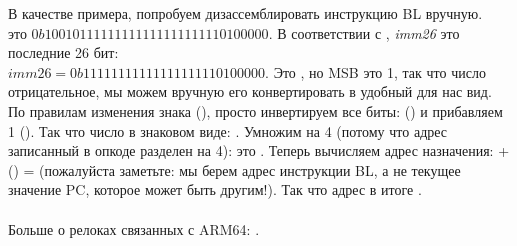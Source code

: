 В качестве примера, попробуем дизассемблировать инструкцию BL вручную.\\
 это $0b10010111111111111111111110100000$.
В соответствии с , \emph{imm26} это последние 26 бит:\\
$imm26 = 0b11111111111111111110100000$.
Это , но \ac{MSB} это 1, 
так что число отрицательное, мы можем вручную его конвертировать в удобный для нас вид.
По правилам изменения знака (), просто инвертируем все биты: () и прибавляем 1 ().
Так что число в знаковом виде: .
Умножим  на 4 (потому что адрес записанный в опкоде разделен на 4): это .
Теперь вычисляем адрес назначения:  + () =  
(пожалуйста заметьте: мы берем адрес инструкции BL, а не текущее значение \ac{PC}, которое может быть другим!).
Так что адрес в итоге .\\
\\
Больше о релоках связанных с ARM64: \ARMELF.
